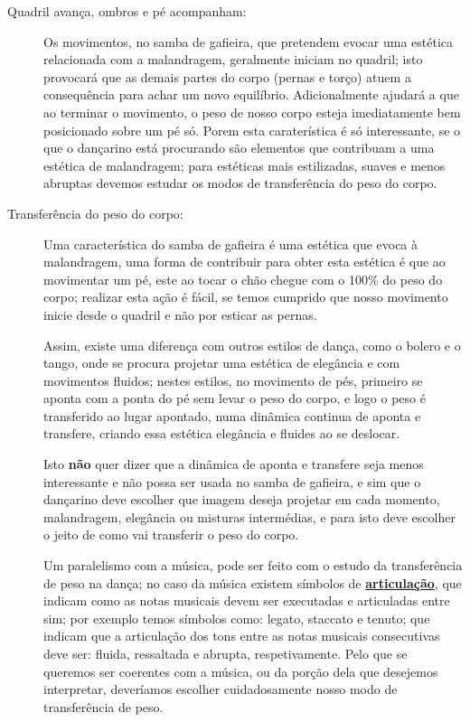\begin{description}
\item[Quadril avança, ombros e pé acompanham:]  Os movimentos, no samba de gafieira, 
que pretendem evocar uma estética relacionada com a malandragem,  geralmente iniciam no quadril;
isto provocará que as demais partes do corpo (pernas e torço) atuem a consequência para achar um novo equilíbrio.
Adicionalmente ajudará a que ao terminar o movimento, o peso de nosso corpo esteja imediatamente bem posicionado sobre um pé só.
Porem esta caraterística é só interessante, 
se o que o dançarino está procurando são elementos que contribuam a uma estética de malandragem;
para estéticas mais estilizadas, suaves e menos abruptas devemos estudar os modos de transferência do peso do corpo.

\item[Transferência do peso do corpo:] %
Uma característica do samba de gafieira é uma estética que evoca à malandragem, 
uma forma de contribuir para obter esta estética é que ao movimentar um pé, 
este ao tocar o chão chegue com o 100\% do peso do corpo; realizar esta ação é fácil, 
se temos cumprido que nosso movimento inicie desde o quadril e não por esticar as pernas.

Assim, existe uma diferença com outros estilos de dança, 
como o bolero e o tango, 
onde se procura projetar uma estética de elegância e com movimentos fluidos;
nestes estilos, no movimento de pés, primeiro se aponta com a ponta do pé sem levar o peso do corpo,
 e logo o peso é transferido ao lugar apontado, numa dinâmica continua de aponta e transfere,
criando essa estética elegância e fluides ao se deslocar.

Isto \textbf{não} quer dizer que a dinâmica de aponta e transfere seja menos interessante e não possa ser usada no samba de gafieira,
e sim que o dançarino deve escolher que imagem deseja projetar em cada momento,
malandragem, elegância ou misturas intermédias, e para isto deve escolher o jeito de como vai transferir o peso do corpo. 

Um paralelismo com a música, pode ser feito com o estudo da transferência de peso na dança;
no caso da música existem símbolos de \hyperref[sub:Articulação]{\textbf{articulação}}, 
que indicam como as notas musicais devem ser executadas e articuladas entre sim;
por exemplo temos símbolos como: legato, staccato e tenuto;
que indicam que a articulação dos tons entre as notas musicais consecutivas deve ser: fluida, ressaltada e  abrupta, respetivamente.
Pelo que se queremos ser coerentes com a música, 
ou da porção dela que desejemos interpretar,
deveríamos escolher cuidadosamente nosso modo de transferência de peso.



\end{description}
